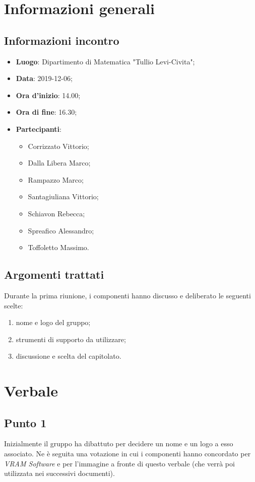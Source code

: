 \section{Informazioni generali}
    \subsection{Informazioni incontro}
        \begin{itemize}
            \item \textbf{Luogo}: Dipartimento di Matematica "Tullio Levi-Civita";
            \item \textbf{Data}: 2019-12-06;
            \item \textbf{Ora d'inizio}: 14.00;
            \item \textbf{Ora di fine}: 16.30;
            \item \textbf{Partecipanti}: \begin{itemize}
                \item Corrizzato Vittorio;
                \item Dalla Libera Marco;
                \item Rampazzo Marco;
                \item Santagiuliana Vittorio;
                \item Schiavon Rebecca;
                \item Spreafico Alessandro;
                \item Toffoletto Massimo.
            \end{itemize}
        \end{itemize}
    \subsection{Argomenti trattati}
        Durante la prima riunione, i componenti hanno discusso e deliberato le seguenti scelte:
        \begin{enumerate}
            \item nome e logo del gruppo;
            \item strumenti di supporto da utilizzare;
            \item discussione e scelta del capitolato\glo.
        \end{enumerate}
\section{Verbale}
    \subsection{Punto 1}
        Inizialmente il gruppo ha dibattuto per decidere un nome e un logo a esso associato. Ne è seguita una votazione in cui i componenti hanno
        concordato per \textit{VRAM Software} e per l'immagine a fronte di questo verbale (che verrà poi utilizzata nei successivi documenti).
